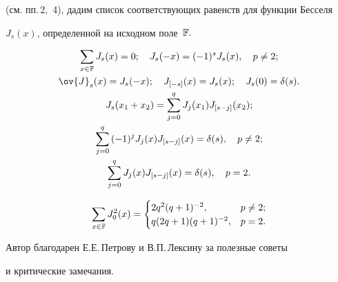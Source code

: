 (см. пп.\,2,~4), дадим список соответствующих равенств для функции Бесселя


$J_s(x)$, определенной на исходном поле~${\Bbb F}.$ 





\begin{props}


\begin{gather*}


\sum_{x\in{\Bbb F}}{J_s(x)}=0;\quad


J_s(-x)=(-1)^sJ_s(x), \quad p\neq2;\\


%


\ov{J}_s(x)=J_s(-x);\quad


J_{[-s]}(x)=J_s(x);\quad J_s(0)=\delta(s). \\


%


J_s(x_1+x_2)=\sum_{j=0}^q{J_j(x_1)J_{[s-j]}(x_2)};\\


%


\sum_{j=0}^q{(-1)^jJ_j(x)J_{[s-j]}(x)}=\delta(s),\quad p\neq2;\\


%


\sum_{j=0}^q{J_j(x)J_{[s-j]}(x)}=\delta(s),\quad p=2.


\end{gather*}


\end{props}





\begin{props}


$$


\sum_{x\in{\Bbb F}}{J_0^2(x)}=


\begin{cases} 2q^2(q+1)^{-2}, & p\neq2; \\


q(2q+1)(q+1)^{-2}, & p=2.


\end{cases}


$$


\end{props}





Автор благодарен Е.Е.\,Петрову и В.П.\,Лексину за полезные советы


и критические замечания.





